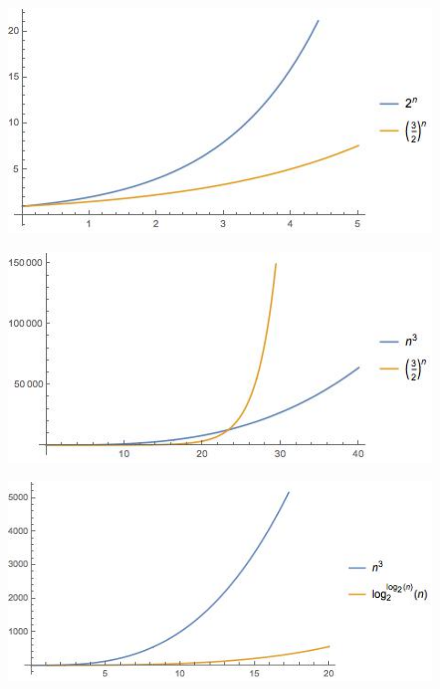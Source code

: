 \documentclass[11 pt, a4paper]{article}
\theoremstyle{definition}
\begin{document}
\begin{enumerate}
\begin{figure}[H]
      \end{figure} \begin{figure}[H]
         \centering
          \includegraphics[trim=0cm 0cm 0cm 0cm, width=12cm]{7.jpg} 
      \end{figure} \begin{figure}[H]
         \centering
          \includegraphics[trim=0cm 0cm 0cm 0cm, width=12cm]{8.jpg} 
      \end{figure} \begin{figure}[H]
         \centering
          \includegraphics[trim=0cm 0cm 0cm 0cm, width=12cm]{9.jpg} 
      \end{figure} \begin{figure}[H]

\end{figure}
\end{enumerate}
\end{document}
